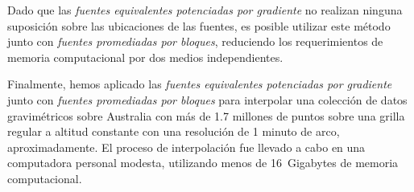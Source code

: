Dado que las \emph{fuentes equivalentes potenciadas por gradiente} no realizan
ninguna suposición sobre las ubicaciones de las fuentes, es posible utilizar
este método junto con \emph{fuentes promediadas por bloques}, reduciendo los
requerimientos de memoria computacional por dos medios independientes.

Finalmente, hemos aplicado las \emph{fuentes equivalentes potenciadas por
gradiente} junto con \emph{fuentes promediadas por bloques} para interpolar una
colección de datos gravimétricos sobre Australia con más de 1.7 millones de
puntos sobre una grilla regular a altitud constante con una resolución de
1 minuto de arco, aproximadamente.
El proceso de interpolación fue llevado a cabo en una computadora personal
modesta, utilizando menos de 16~Gigabytes de memoria computacional.
